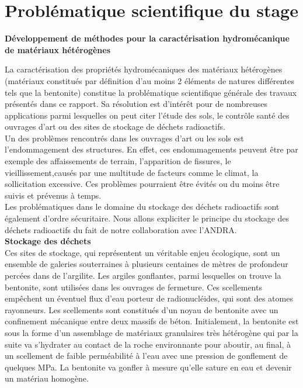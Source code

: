 \chapter{Problématique scientifique du stage}
\begin{large}
\textbf{Développement de méthodes pour la caractérisation hydromécanique de matériaux hétérogènes}\\
\end{large}
\break
La caractérisation des propriétés hydromécaniques des matériaux hétérogènes (matériaux constitués par définition d'au moins 2 éléments de natures différentes tels que la bentonite) constitue la problématique scientifique générale des travaux présentés dans ce rapport. Sa résolution est d'intérêt pour de nombreuses applications parmi lesquelles on peut citer l'étude des sols, le contrôle santé des ouvrages d'art ou des sites de stockage de déchets radioactifs.\\
Un des problèmes rencontrés dans les ouvrages d'art ou les sols est l'endommagement des structures. En effet, ces endommagements peuvent être par exemple des affaissements de terrain, l'apparition de fissures, le vieillissement,causés par une multitude de facteurs comme le climat, la sollicitation excessive. Ces problèmes pourraient être évités ou du moins être suivis et prévenus à temps.\\
Les problématiques dans le domaine du stockage des déchets radioactifs sont également d'ordre sécuritaire. Nous allons expliciter le principe du stockage des déchets radioactifs du fait de notre collaboration avec l'ANDRA.\\
\linebreak
\linebreak
\textbf{Stockage des déchets}\\
\linebreak
\linebreak
Ces sites de stockage, qui représentent un véritable enjeu écologique, sont un ensemble de galeries souterraines à plusieurs centaines de mètres de profondeur percées dans de l'argilite.
Les argiles gonflantes, parmi lesquelles on trouve la bentonite, sont utilisées dans les ouvrages de fermeture. Ces scellements empêchent un éventuel flux d'eau porteur de radionucléides, qui sont des atomes rayonneurs. Les scellements sont constitués d'un noyau de bentonite avec un confinement mécanique entre deux massifs de béton. Initialement, la bentonite est sous la forme d'un assemblage de matériaux granulaires très hétérogène qui par la suite va s'hydrater au contact de la roche environnante pour aboutir, au final, à un scellement de faible perméabilité à l'eau avec une pression de gonflement de quelques MPa. La bentonite va gonfler à mesure qu'elle sature en eau et devenir un matériau homogène.\\
